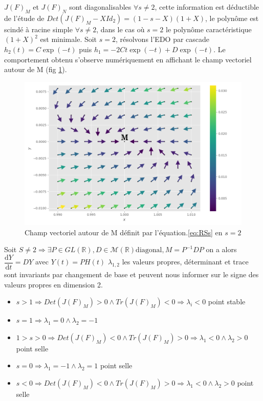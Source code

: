 \documentclass{wsdcr}
\begin{document}
$J(F)_{M}$ et $ J(F)_{N}$ sont diagonalisables $\forall s \neq 2$, cette information est déductible de l'étude de $Det(J(F)_{M}-XId_2)=(1-s-X)(1+X)$, le polynôme est scindé à racine simple $\forall s \neq 2$, dans le cas où $s=2$ le polynôme caractéristique $(1+X)^2$ est minimale. Soit $s=2$, résolvons l'EDO par cascade $h_2(t)=C\exp(-t)$ puis $h_1=-2Ct\exp(-t)+D\exp(-t)$. Le comportement obtenu s'observe numériquement en affichant le champ vectoriel autour de M (fig \ref{fig:JM}). \\
\begin{figure}
    \centering
    \includegraphics[width=\linewidth]{fig/lv2_vfM.png}
    \caption{Champ vectoriel autour de M définit par l'équation.\ref{eq:RSs} en $s=2$}
    \label{fig:JM}
\end{figure}
Soit $S\neq2 \Rightarrow \exists P \in GL(\mathbb{R}),D \in \mathcal{M}(\mathbb{R}) \text{diagonal}, M = P^{-1}DP$ on a alors ${\dfrac {\mathrm {d} Y}{\mathrm {d} t}}=DY$ avec $Y(t)=PH(t)$ $\lambda_{1,2}$ les valeurs propres, déterminant et trace sont invariants par changement de base et peuvent nous informer sur le signe des valeurs propres en dimension 2.
\begin{itemize}
	\item $s>1 \Rightarrow Det(J(F)_{M})>0 \land Tr(J(F)_{M})<0 \Rightarrow \lambda_i<0$ {\color{red}point stable}
	\item $s=1 \Rightarrow \lambda_1=0 \land \lambda_2=-1$ 
	\item $1>s>0 \Rightarrow Det(J(F)_{M})<0 \land Tr(J(F)_{M})>0 \Rightarrow \lambda_1<0 \land \lambda_2>0$ {\color{red}point selle}
	\item $s=0 \Rightarrow \lambda_1=-1 \land \lambda_2=1$ {\color{red}point selle}
	\item $s<0 \Rightarrow Det(J(F)_{M})<0 \land Tr(J(F)_{M})>0 \Rightarrow \lambda_1<0 \land \lambda_2>0$ {\color{red}point selle}
\end{itemize}
\end{document}
